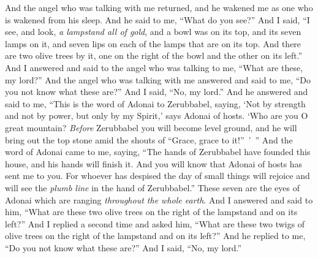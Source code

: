 \begin{biblechapter} %
 And the angel who was talking with me returned, and he wakened me as one who is wakened from his sleep.
\verse And he said to me, “What do you see?” And I said, “I see, and look, \textit{a lampstand all of gold}, and a bowl was on its top, and its seven lamps on it, and seven lips on each of the lamps that are on its top.
\verse And there are two olive trees by it, one on the right of the bowl and the other on its left.”
\verse And I answered and said to the angel who was talking to me, “What are these, my lord?”
\verse And the angel who was talking with me answered and said to me, “Do you not know what these are?” And I said, “No, my lord.”
\verse And he answered and said to me, “This is the word of Adonai to Zerubbabel, saying, ‘Not by strength and not by power, but only by my Spirit,’ says Adonai of hosts.
\verse ‘Who are you O great mountain? \textit{Before} Zerubbabel you will become level ground, and he will bring out the top stone amid the shouts of “Grace, grace to it!” ’ ”
\verse And the word of Adonai came to me, saying,
\verse “The hands of Zerubbabel have founded this house, and his hands will finish it. And you will know that Adonai of hosts has sent me to you.
\verse For whoever has despised the day of small things will rejoice and will see the \textit{plumb line} in the hand of Zerubbabel.”
\verse These seven are the eyes of Adonai which are ranging \textit{throughout the whole earth}.
\verse And I answered and said to him, “What are these two olive trees on the right of the lampstand and on its left?”
\verse And I replied a second time and asked him, “What are these two twigs of olive trees on the right of the lampstand and on its left?”
\verse And he replied to me, “Do you not know what these are?” And I said, “No, my lord.”
\end{biblechapter}

